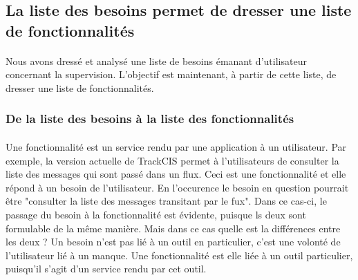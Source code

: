 	\subsection{La liste des besoins permet de dresser une liste de fonctionnalités}
		\paragraph{}%
		Nous avons dressé et analysé une liste de besoins émanant d'utilisateur
		concernant la supervision. L'objectif est maintenant, à partir de cette liste,
		de dresser une liste de fonctionnalités.
		
		\subsubsection{De la liste des besoins à la liste des fonctionnalités}
			\paragraph{}%
			Une fonctionnalité est un service rendu par une application à un utilisateur.
			Par exemple, la version actuelle de TrackCIS permet à l'utilisateurs de
			consulter la liste des messages qui sont passé dans un flux. Ceci est une
			fonctionnalité et elle répond à un besoin de l'utilisateur. En l'occurence le
			besoin en question pourrait être "consulter la liste des messages transitant
			par le fux". Dans ce cas-ci, le passage du besoin à la fonctionnalité est
			évidente, puisque ls deux sont formulable de la même manière. Mais dans ce
			cas quelle est la différences entre les deux ? Un besoin n'est pas lié à un
			outil en particulier, c'est une volonté de l'utilisateur lié à un manque. Une
			fonctionnalité est elle liée à un outil particulier, puisqu'il s'agit d'un
			service rendu par cet outil.
		

